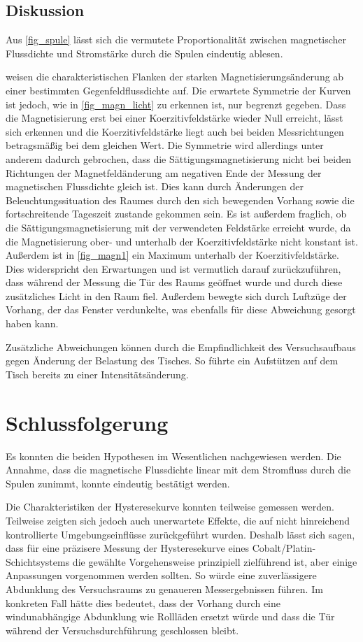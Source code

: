 \documentclass[
	a4paper,
	12pt,
	pagesize,
	ngerman
]{scrartcl}
\begin{document}
	\subsection{Diskussion}

	Aus \cref{fig_spule} lässt sich die vermutete Proportionalität zwischen magnetischer Flussdichte und Stromstärke durch die Spulen eindeutig ablesen.
	
	 weisen die charakteristischen Flanken der starken Magnetisierungsänderung ab einer bestimmten Gegenfeldflussdichte auf.
	Die erwartete Symmetrie der Kurven ist jedoch, wie in \cref{fig_magn_licht} zu erkennen ist, nur begrenzt gegeben.
	Dass die Magnetisierung erst bei einer Koerzitivfeldstärke wieder Null erreicht, lässt sich erkennen und die Koerzitivfeldstärke liegt auch bei beiden Messrichtungen betragsmäßig bei dem gleichen Wert.
	Die Symmetrie wird allerdings unter anderem dadurch gebrochen, dass die Sättigungsmagnetisierung nicht bei beiden Richtungen der Magnetfeldänderung am negativen Ende der Messung der magnetischen Flussdichte gleich ist.
	Dies kann durch Änderungen der Beleuchtungssituation des Raumes durch den sich bewegenden Vorhang sowie die fortschreitende Tageszeit zustande gekommen sein.
	Es ist außerdem fraglich, ob die Sättigungsmagnetisierung mit der verwendeten Feldstärke erreicht wurde, da die Magnetisierung ober- und unterhalb der Koerzitivfeldstärke nicht konstant ist.
	Außerdem ist in \cref{fig_magn1} ein Maximum unterhalb der Koerzitivfeldstärke.
	Dies widerspricht den Erwartungen und ist vermutlich darauf zurückzuführen, dass während der Messung die Tür des Raums geöffnet wurde und durch diese zusätzliches Licht in den Raum fiel.
	Außerdem bewegte sich durch Luftzüge der Vorhang, der das Fenster verdunkelte, was ebenfalls für diese Abweichung gesorgt haben kann.
	
	Zusätzliche Abweichungen können durch die Empfindlichkeit des Versuchsaufbaus gegen Änderung der Belastung des Tisches.
	So führte ein Aufstützen auf dem Tisch bereits zu einer Intensitätsänderung.
	
	\section{Schlussfolgerung}
	Es konnten die beiden Hypothesen im Wesentlichen nachgewiesen werden.
	Die Annahme, dass die magnetische Flussdichte linear mit dem Stromfluss durch die Spulen zunimmt, konnte eindeutig bestätigt werden.
	
	Die Charakteristiken der Hysteresekurve konnten teilweise gemessen werden.
	Teilweise zeigten sich jedoch auch unerwartete Effekte, die auf nicht hinreichend kontrollierte Umgebungseinflüsse zurückgeführt wurden.
	Deshalb lässt sich sagen, dass für eine präzisere Messung der Hysteresekurve eines Cobalt/Platin-Schichtsystems die gewählte Vorgehensweise prinzipiell zielführend ist, aber einige Anpassungen vorgenommen werden sollten.
	So würde eine zuverlässigere Abdunklung des Versuchsraums zu genaueren Messergebnissen führen. 
	Im konkreten Fall hätte dies bedeutet, dass der Vorhang durch eine windunabhängige Abdunklung wie Rollläden ersetzt würde und dass die Tür während der Versuchsdurchführung geschlossen bleibt.
	
\end{document}
